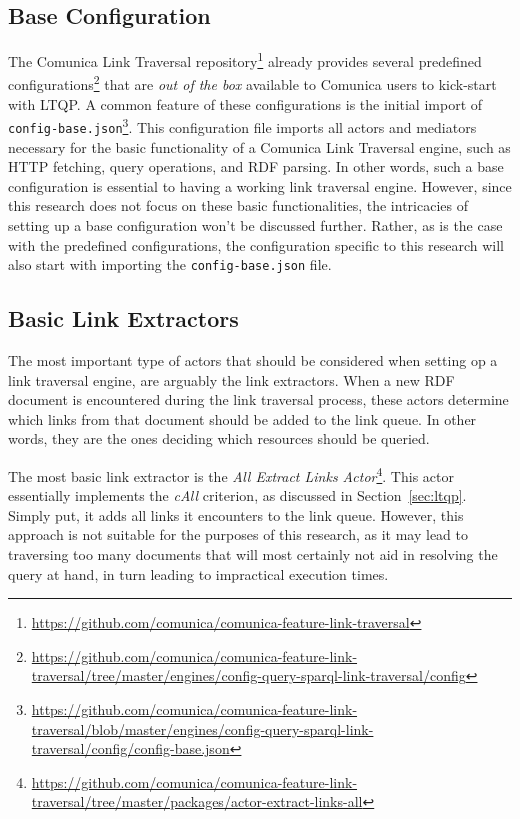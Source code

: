 \subsection{Base Configuration}

The Comunica Link Traversal repository\footnote{\href{https://github.com/comunica/comunica-feature-link-traversal}{https://github.com/comunica/comunica-feature-link-traversal}} already provides several predefined configurations\footnote{\href{https://github.com/comunica/comunica-feature-link-traversal/tree/master/engines/config-query-sparql-link-traversal/config}{https://github.com/comunica/comunica-feature-link-traversal/tree/master/engines/config-query-sparql-link-traversal/config}} that are \textit{out of the box} available to Comunica users to kick-start with LTQP. A common feature of these configurations is the initial import of \linebreak\texttt{config-base.json}\footnote{\href{https://github.com/comunica/comunica-feature-link-traversal/blob/master/engines/config-query-sparql-link-traversal/config/config-base.json}{https://github.com/comunica/comunica-feature-link-traversal/blob/master/engines/config-query-sparql-link-traversal/config/config-base.json}}. This configuration file imports all actors and mediators necessary for the basic functionality of a Comunica Link Traversal engine, such as HTTP fetching, query operations, and RDF parsing. In other words, such a base configuration is essential to having a working link traversal engine. However, since this research does not focus on these basic functionalities, the intricacies of setting up a base configuration won't be discussed further. Rather, as is the case with the predefined configurations, the configuration specific to this research will also start with importing the \texttt{config-base.json} file.

\subsection{Basic Link Extractors}

The most important type of actors that should be considered when setting op a link traversal engine, are arguably the link extractors. When a new RDF document is encountered during the link traversal process, these actors determine which links from that document should be added to the link queue. In other words, they are the ones deciding which resources should be queried.

The most basic link extractor is the \textit{All Extract Links Actor}\footnote{\href{https://github.com/comunica/comunica-feature-link-traversal/tree/master/packages/actor-extract-links-all}{https://github.com/comunica/comunica-feature-link-traversal/tree/master/packages/actor-extract-links-all}}. This actor essentially implements the \textit{cAll} criterion, as discussed in Section~\ref{sec:ltqp}. Simply put, it adds all links it encounters to the link queue. However, this approach is not suitable for the purposes of this research, as it may lead to traversing too many documents that will most certainly not aid in resolving the query at hand, in turn leading to impractical execution times.

